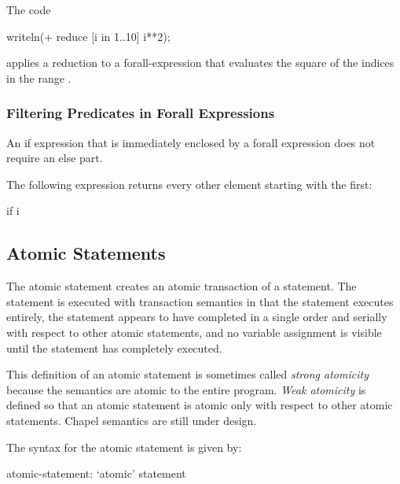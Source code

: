 \begin{example}
The code
\begin{chapel}
writeln(+ reduce [i in 1..10] i**2);
\end{chapel}
applies a reduction to a forall-expression that evaluates the square
of the indices in the range .
\end{example}

\subsubsection{Filtering Predicates in Forall Expressions}
\label{Filtering_Predicates_Forall}

An if expression that is immediately enclosed by a forall expression
does not require an else part.
\begin{example}
The following expression returns every other element starting with the
first:
\begin{chapel}
[i in 1..s.length] if i %
\end{chapel}
\end{example}

\subsection{Atomic Statements}
\label{Atomic_Transactions}
\label{atomicity}

The atomic statement creates an atomic transaction of a statement. The
statement is executed with transaction semantics in that the statement
executes entirely, the statement appears to have completed in a single
order and serially with respect to other atomic statements, and no
variable assignment is visible until the statement has completely
executed.

\begin{openissue}
This definition of an atomic statement is sometimes called {\em strong
atomicity} because the semantics are atomic to the entire program.
{\em Weak atomicity} is defined so that an atomic statement is atomic
only with respect to other atomic statements.  Chapel semantics are
still under design.
\end{openissue}

The syntax for the atomic statement is given by:
\begin{syntax}
atomic-statement:
  `atomic' statement
\end{syntax}

